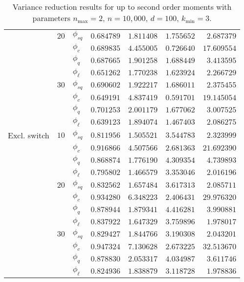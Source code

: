 \begin{table}[]
{\begin{tabular}{l@{\hskip 12pt}l@{\hskip 12pt}l@{\hskip 12pt}r@{\hskip 12pt}r@{\hskip 12pt}r@{\hskip 12pt}r}
            & $20$ &$\phi_{sq}$ &  $0.684789$ &  $1.811408$ &    $1.755652$ &   $2.687379$ \\
            &    &$\phi_{c}$ &  $0.689835$ &  $4.455005$ &    $0.726640$ &  $17.609554$ \\
            &    &$\phi_{q}$ &  $0.687665$ &  $1.901258$ &    $1.688449$ &   $3.413595$ \\
            &    &$\phi_{\ell}$ &  $0.651262$ &  $1.770238$ &    $1.623924$ &   $2.266729$ \\\cmidrule{2-7}
            & $30$ &$\phi_{sq}$ &  $0.690602$ &  $1.922217$ &    $1.686011$ &   $2.375455$ \\
            &    &$\phi_{c}$ &  $0.649191$ &  $4.837419$ &    $0.591701$ &  $19.145054$ \\
            &    &$\phi_{q}$ &  $0.701253$ &  $2.001179$ &    $1.677062$ &   $3.007525$ \\
            &    &$\phi_{\ell}$ &  $0.639123$ &  $1.894074$ &    $1.467403$ &   $2.086275$ \\\midrule
Excl. switch & $10$ &$\phi_{sq}$ &  $0.811956$ &  $1.505521$ &    $3.544783$ &   $2.323999$ \\
            &    &$\phi_{c}$ &  $0.916866$ &  $4.507566$ &    $2.681363$ &  $21.692390$ \\
            &    &$\phi_{q}$ &  $0.868874$ &  $1.776190$ &    $4.309354$ &   $4.739893$ \\
            &    & $\phi_{\ell}$ &  $0.795802$ &  $1.466579$ &    $3.353046$ &   $2.016196$ \\\cmidrule{2-7}
            & $20$ &$\phi_{sq}$ &  $0.832562$ &  $1.657484$ &    $3.617313$ &   $2.085711$ \\
            &    &$\phi_{c}$ &  $0.934280$ &  $6.348223$ &    $2.406431$ &  $29.976320$ \\
            &    &$\phi_{q}$ &  $0.878944$ &  $1.879341$ &    $4.416281$ &   $3.990881$ \\
            &    & $\phi_{\ell}$ &  $0.837922$ &  $1.647329$ &    $3.759896$ &   $1.978017$ \\\cmidrule{2-7}
            & $30$ &$\phi_{sq}$ &  $0.829427$ &  $1.844766$ &    $3.190308$ &   $2.043201$ \\
            &    &$\phi_{c}$ &  $0.947324$ &  $7.130628$ &    $2.673225$ &  $32.513670$ \\
            &    &$\phi_{q}$ &  $0.878830$ &  $2.053317$ &    $4.034987$ &   $3.611746$ \\
            &    & $\phi_{\ell}$ &  $0.824936$ &  $1.838879$ &    $3.118728$ &   $1.978836$ \\
\bottomrule
\end{tabular}}
    \caption[Variance reduction results for up to second order moments]{Variance reduction results for up to second order moments with parameters $n_{\max}=2$, $n=10,000$, $d=100$, $k_{\min}=3$.}
    \label{tab:eff2}
\end{table}

